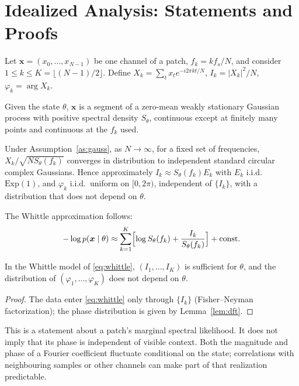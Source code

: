 \clearpage
\setcounter{page}{1}
\maketitlesupplementary
\appendix
\section{Idealized Analysis: Statements and Proofs}\label{app:theory}
Let $\bm{x}=(x_0,\dots,x_{N-1})$ be one channel of a patch, $f_k=kf_s/N$, and consider
$1\le k\le K=\lfloor(N-1)/2\rfloor$. Define $X_k=\sum_t x_te^{-i2\pi kt/N}$,
$I_k=|X_k|^2/N$, $\varphi_k=\arg X_k$.

\begin{assumption}\label{as:gauss}
Given the state $\theta$, $\bm{x}$ is a segment of a zero-mean weakly stationary Gaussian
process with positive spectral density $S_\theta$, continuous except at finitely many points
and continuous at the $f_k$ used.
\end{assumption}

\begin{lemma}\label{lem:dft}
Under Assumption~\ref{as:gauss}, as $N\to\infty$, for a fixed set of frequencies,
$X_k/\sqrt{NS_\theta(f_k)}$ converges in distribution to independent standard circular complex
Gaussians. Hence approximately $I_k\approx S_\theta(f_k)E_k$ with $E_k$ i.i.d.\
$\mathrm{Exp}(1)$, and $\varphi_k$ i.i.d.\ uniform on $[0,2\pi)$, independent of $\{I_k\}$,
with a distribution that does not depend on $\theta$.
\end{lemma}
\noindent The Whittle approximation \cite{whittle1953} follows:
\begin{equation}\label{eq:whittle}
-\log p(\bm{x}\mid\theta)\approx\sum_{k=1}^{K}\Bigl[\log S_\theta(f_k)+\frac{I_k}{S_\theta(f_k)}\Bigr]+\text{const}.
\end{equation}

\begin{proposition}\label{prop:suff}
In the Whittle model of \eqref{eq:whittle}, $(I_1,\dots,I_K)$ is sufficient for
$\theta$, and the distribution of $(\varphi_1,\dots,\varphi_K)$ does not depend on $\theta$.
\end{proposition}
\begin{proof}
The data enter \eqref{eq:whittle} only through $\{I_k\}$ (Fisher--Neyman factorization); the
phase distribution is given by Lemma~\ref{lem:dft}.
\end{proof}
\noindent This is a statement about a patch's marginal spectral likelihood. It does not
imply that its phase is independent of visible context. Both the magnitude and phase of a
Fourier coefficient fluctuate conditional on the state; correlations with neighbouring
samples or other channels can make part of that realization predictable.

